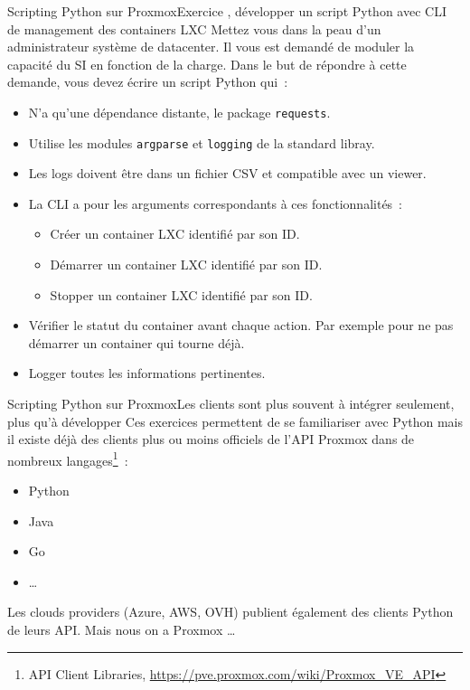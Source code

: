 \documentclass{beamer}
\begin{document}
    \begin{frame}{Scripting Python sur Proxmox}{Exercice \execcounterdispinc{}, développer un script Python avec CLI de management des containers LXC}
        Mettez vous dans la peau d'un administrateur système de datacenter.
        Il vous est demandé de moduler la capacité du SI en fonction de la charge.
        Dans le but de répondre à cette demande, vous devez écrire un script Python qui~:
        \begin{itemize}
            \item N'a qu'une dépendance distante, le package \lstinline{requests}.
            \item Utilise les modules \lstinline{argparse} et \lstinline{logging} de la standard libray.
            \item Les logs doivent être dans un fichier CSV et compatible avec un viewer.
            \item La CLI a pour les arguments correspondants à ces fonctionnalités~:
            \begin{itemize}
                \item Créer un container LXC identifié par son ID.
                \item Démarrer un container LXC identifié par son ID.
                \item Stopper un container LXC identifié par son ID.
            \end{itemize}
            \item Vérifier le statut du container avant chaque action.
            Par exemple pour ne pas démarrer un container qui tourne déjà.
            \item Logger toutes les informations pertinentes.
        \end{itemize}
    \end{frame}

    \begin{frame}{Scripting Python sur Proxmox}{Les clients sont plus souvent à intégrer seulement, plus qu'à développer}
        Ces exercices permettent de se familiariser avec Python mais il existe déjà des clients plus ou moins officiels de l'API Proxmox dans de nombreux langages\footnote{API Client Libraries, \url{https://pve.proxmox.com/wiki/Proxmox_VE_API}}~:
        \begin{itemize}
            \item Python
            \item Java
            \item Go
            \item \ldots
        \end{itemize}
        \bigbreak
        Les clouds providers (Azure, AWS, OVH) publient également des clients Python de leurs API.
        Mais nous on a Proxmox \ldots
    \end{frame}
\end{document}
